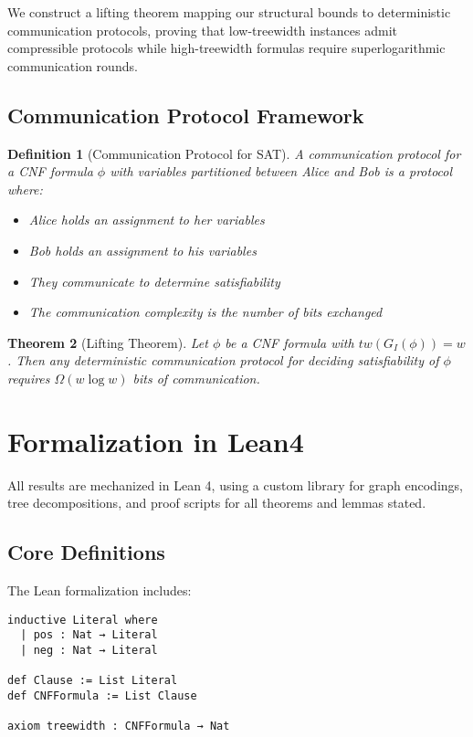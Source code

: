 \documentclass[11pt]{article}
\newtheorem{theorem}{Theorem}
\newtheorem{definition}[theorem]{Definition}
\begin{document}
We construct a lifting theorem mapping our structural bounds to deterministic communication protocols, proving that low-treewidth instances admit compressible protocols while high-treewidth formulas require superlogarithmic communication rounds.

\subsection{Communication Protocol Framework}

\begin{definition}[Communication Protocol for SAT]
A communication protocol for a CNF formula $\phi$ with variables partitioned between Alice and Bob is a protocol where:
\begin{itemize}
\item Alice holds an assignment to her variables
\item Bob holds an assignment to his variables
\item They communicate to determine satisfiability
\item The communication complexity is the number of bits exchanged
\end{itemize}
\end{definition}

\begin{theorem}[Lifting Theorem]
\label{thm:lifting}
Let $\phi$ be a CNF formula with $tw(G_I(\phi)) = w$. Then any deterministic communication protocol for deciding satisfiability of $\phi$ requires $\Omega(w \log w)$ bits of communication.
\end{theorem}

\section{Formalization in Lean4}

All results are mechanized in Lean 4, using a custom library for graph encodings, tree decompositions, and proof scripts for all theorems and lemmas stated.

\subsection{Core Definitions}

The Lean formalization includes:

\begin{verbatim}
inductive Literal where
  | pos : Nat → Literal
  | neg : Nat → Literal

def Clause := List Literal
def CNFFormula := List Clause

axiom treewidth : CNFFormula → Nat
\end{verbatim}
\end{document}
